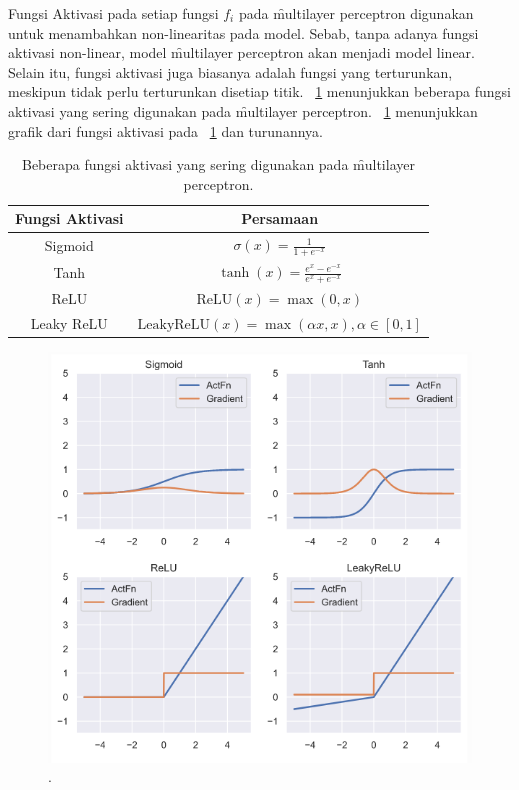     Fungsi Aktivasi pada setiap fungsi $f_i$ pada \f{multilayer perceptron} digunakan untuk menambahkan non-linearitas pada model. Sebab, tanpa adanya fungsi aktivasi non-linear, model \f{multilayer perceptron} akan menjadi model linear. Selain itu, fungsi aktivasi juga biasanya adalah fungsi yang terturunkan, meskipun tidak perlu terturunkan disetiap titik. \tab~\ref{tab:activation-function} menunjukkan beberapa fungsi aktivasi yang sering digunakan pada \f{multilayer perceptron}. \pic~\ref{fig:activation-function} menunjukkan grafik dari fungsi aktivasi pada \tab~\ref{tab:activation-function} dan turunannya.
    \begin{table}
        \centering
        \caption{Beberapa fungsi aktivasi yang sering digunakan pada \f{multilayer perceptron}.}
        \label{tab:activation-function}
        \begin{tabular}{|c|c|}
            \hline
            \textbf{Fungsi Aktivasi} & \textbf{Persamaan} \\
            \hline
            \hline
            Sigmoid & $\sigma(x) = \frac{1}{1 + e^{-x}}$ \\
            \hline
            Tanh & $\tanh(x) = \frac{e^x - e^{-x}}{e^x + e^{-x}}$ \\
            \hline
            ReLU & $\text{ReLU}(x) = \max(0, x)$ \\
            \hline
            Leaky ReLU & $\text{LeakyReLU}(x) = \max(\alpha x, x), \alpha \in [0, 1]$ \\
            \hline
        \end{tabular}
    \end{table}
    \begin{figure}
        \centering
        \includegraphics[width=1\textwidth]{assets/pics/act_function.png}
        \caption{\license.}
        \label{fig:activation-function}
    \end{figure}


